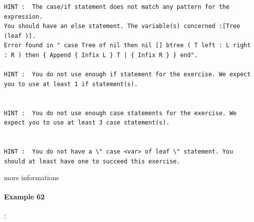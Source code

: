 \documentclass[11pt,a4paper,twoside,openright]{report}
\begin{document}
\begin{lstlisting}
HINT :  The case/if statement does not match any pattern for the expression. 
You should have an else statement. The variable(s) concerned :[Tree (leaf )]. 
Error found in " case Tree of nil then nil [] btree ( T left : L right : R ) then { Append { Infix L } T | { Infix R } } end".

HINT :  You do not use enough if statement for the exercise. We expect you to use at least 1 if statement(s).


HINT :  You do not use enough case statements for the exercise. We expect you to use at least 3 case statement(s).


HINT :  You do not have a \" case <var> of leaf \" statement. You should at least have one to succeed this exercise.
\end{lstlisting}


%
%
%	
%
%
%
more informations
%
%
%

\paragraph{Example 62}:
\end{document}
